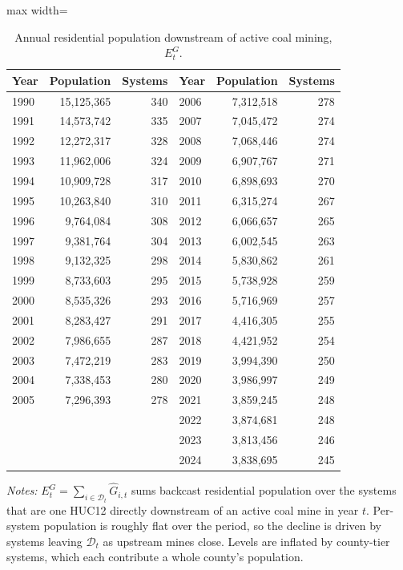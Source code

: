 \begin{table}[ht]
\centering
\caption{Annual residential population downstream of active coal mining, $E^{G}_t$.}
\label{tab:backcast_exposure_series}
\begin{adjustbox}{max width=\textwidth}
\begin{tabular}{lrr@{\hskip 2.5em}lrr}
\toprule
Year & Population & Systems & Year & Population & Systems \\
\midrule
1990 & 15,125,365 & 340 & 2006 & 7,312,518 & 278 \\
1991 & 14,573,742 & 335 & 2007 & 7,045,472 & 274 \\
1992 & 12,272,317 & 328 & 2008 & 7,068,446 & 274 \\
1993 & 11,962,006 & 324 & 2009 & 6,907,767 & 271 \\
1994 & 10,909,728 & 317 & 2010 & 6,898,693 & 270 \\
1995 & 10,263,840 & 310 & 2011 & 6,315,274 & 267 \\
1996 & 9,764,084 & 308 & 2012 & 6,066,657 & 265 \\
1997 & 9,381,764 & 304 & 2013 & 6,002,545 & 263 \\
1998 & 9,132,325 & 298 & 2014 & 5,830,862 & 261 \\
1999 & 8,733,603 & 295 & 2015 & 5,738,928 & 259 \\
2000 & 8,535,326 & 293 & 2016 & 5,716,969 & 257 \\
2001 & 8,283,427 & 291 & 2017 & 4,416,305 & 255 \\
2002 & 7,986,655 & 287 & 2018 & 4,421,952 & 254 \\
2003 & 7,472,219 & 283 & 2019 & 3,994,390 & 250 \\
2004 & 7,338,453 & 280 & 2020 & 3,986,997 & 249 \\
2005 & 7,296,393 & 278 & 2021 & 3,859,245 & 248 \\
 & &  & 2022 & 3,874,681 & 248 \\
 & &  & 2023 & 3,813,456 & 246 \\
 & &  & 2024 & 3,838,695 & 245 \\
\bottomrule
\end{tabular}
\end{adjustbox}
\begin{minipage}{\textwidth}\footnotesize\raggedright
\vspace{0.5em}
\textit{Notes:} $E^{G}_t=\sum_{i\in\mathcal{D}_t}\hat{G}_{i,t}$ sums backcast residential population over the systems that are one HUC12 directly downstream of an active coal mine in year $t$. Per-system population is roughly flat over the period, so the decline is driven by systems leaving $\mathcal{D}_t$ as upstream mines close. Levels are inflated by county-tier systems, which each contribute a whole county's population.
\end{minipage}
\end{table}
